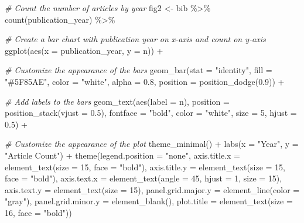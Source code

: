 \documentclass[
]{article}
\newenvironment{Shaded}{\begin{snugshade}}{\end{snugshade}}
\newcommand{\AttributeTok}[1]{\textcolor[rgb]{0.77,0.63,0.00}{#1}}
\newcommand{\CommentTok}[1]{\textcolor[rgb]{0.56,0.35,0.01}{\textit{#1}}}
\newcommand{\DecValTok}[1]{\textcolor[rgb]{0.00,0.00,0.81}{#1}}
\newcommand{\FloatTok}[1]{\textcolor[rgb]{0.00,0.00,0.81}{#1}}
\newcommand{\FunctionTok}[1]{\textcolor[rgb]{0.00,0.00,0.00}{#1}}
\newcommand{\NormalTok}[1]{#1}
\newcommand{\OtherTok}[1]{\textcolor[rgb]{0.56,0.35,0.01}{#1}}
\newcommand{\SpecialCharTok}[1]{\textcolor[rgb]{0.00,0.00,0.00}{#1}}
\newcommand{\StringTok}[1]{\textcolor[rgb]{0.31,0.60,0.02}{#1}}
\begin{document}
\begin{Shaded}
\begin{Highlighting}[]
\CommentTok{\# Count the number of articles by year}
\NormalTok{fig2 }\OtherTok{\textless{}{-}}\NormalTok{ bib }\SpecialCharTok{\%\textgreater{}\%}
  \FunctionTok{count}\NormalTok{(publication\_year) }\SpecialCharTok{\%\textgreater{}\%}
  
  \CommentTok{\# Create a bar chart with publication year on x{-}axis and count on y{-}axis}
  \FunctionTok{ggplot}\NormalTok{(}\FunctionTok{aes}\NormalTok{(}\AttributeTok{x =}\NormalTok{ publication\_year, }\AttributeTok{y =}\NormalTok{ n)) }\SpecialCharTok{+}
  
  \CommentTok{\# Customize the appearance of the bars}
  \FunctionTok{geom\_bar}\NormalTok{(}\AttributeTok{stat =} \StringTok{"identity"}\NormalTok{, }\AttributeTok{fill =} \StringTok{"\#5F85AE"}\NormalTok{, }\AttributeTok{color =} \StringTok{"white"}\NormalTok{, }\AttributeTok{alpha =} \FloatTok{0.8}\NormalTok{, }\AttributeTok{position =} \FunctionTok{position\_dodge}\NormalTok{(}\FloatTok{0.9}\NormalTok{)) }\SpecialCharTok{+}
  
  \CommentTok{\# Add labels to the bars}
  \FunctionTok{geom\_text}\NormalTok{(}\FunctionTok{aes}\NormalTok{(}\AttributeTok{label =}\NormalTok{ n), }\AttributeTok{position =} \FunctionTok{position\_stack}\NormalTok{(}\AttributeTok{vjust =} \FloatTok{0.5}\NormalTok{), }\AttributeTok{fontface =} \StringTok{"bold"}\NormalTok{, }\AttributeTok{color =} \StringTok{"white"}\NormalTok{, }\AttributeTok{size =} \DecValTok{5}\NormalTok{, }\AttributeTok{hjust =} \FloatTok{0.5}\NormalTok{) }\SpecialCharTok{+}
  
  \CommentTok{\# Customize the appearance of the plot}
  \FunctionTok{theme\_minimal}\NormalTok{() }\SpecialCharTok{+}
  \FunctionTok{labs}\NormalTok{(}\AttributeTok{x =} \StringTok{"Year"}\NormalTok{, }\AttributeTok{y =} \StringTok{"Article Count"}\NormalTok{) }\SpecialCharTok{+}
  \FunctionTok{theme}\NormalTok{(}\AttributeTok{legend.position =} \StringTok{"none"}\NormalTok{,}
        \AttributeTok{axis.title.x =} \FunctionTok{element\_text}\NormalTok{(}\AttributeTok{size =} \DecValTok{15}\NormalTok{, }\AttributeTok{face =} \StringTok{"bold"}\NormalTok{),}
        \AttributeTok{axis.title.y =} \FunctionTok{element\_text}\NormalTok{(}\AttributeTok{size =} \DecValTok{15}\NormalTok{, }\AttributeTok{face =} \StringTok{"bold"}\NormalTok{),}
        \AttributeTok{axis.text.x =} \FunctionTok{element\_text}\NormalTok{(}\AttributeTok{angle =} \DecValTok{45}\NormalTok{, }\AttributeTok{hjust =} \DecValTok{1}\NormalTok{, }\AttributeTok{size =} \DecValTok{15}\NormalTok{),}
        \AttributeTok{axis.text.y =} \FunctionTok{element\_text}\NormalTok{(}\AttributeTok{size =} \DecValTok{15}\NormalTok{),}
        \AttributeTok{panel.grid.major.y =} \FunctionTok{element\_line}\NormalTok{(}\AttributeTok{color =} \StringTok{"gray"}\NormalTok{),}
        \AttributeTok{panel.grid.minor.y =} \FunctionTok{element\_blank}\NormalTok{(),}
        \AttributeTok{plot.title =} \FunctionTok{element\_text}\NormalTok{(}\AttributeTok{size =} \DecValTok{16}\NormalTok{, }\AttributeTok{face =} \StringTok{"bold"}\NormalTok{))}
 


\end{Highlighting}
\end{Shaded}
\end{document}
